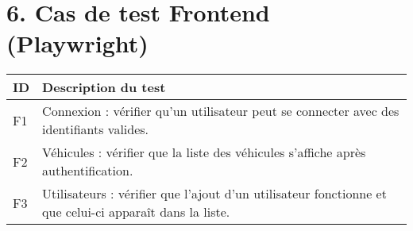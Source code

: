 \documentclass[a4paper,12pt]{article}
\begin{document}
\section*{6. Cas de test Frontend (Playwright)}
\begin{longtable}{|p{}|p{}|}
\hline
\textbf{ID} & \textbf{Description du test} \\
\hline
F1 & Connexion : vérifier qu’un utilisateur peut se connecter avec des identifiants valides. \\
\hline
F2 & Véhicules : vérifier que la liste des véhicules s’affiche après authentification. \\
\hline
F3 & Utilisateurs : vérifier que l’ajout d’un utilisateur fonctionne et que celui-ci apparaît dans la liste. \\
\hline
\end{longtable}
\end{document}

